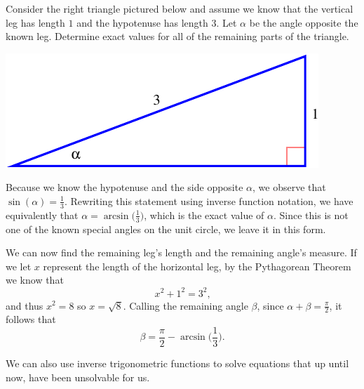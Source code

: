 \documentclass{ximera}
\begin{document}
\begin{example}
%
Consider the right triangle pictured below and assume we know that the vertical leg has length $1$ and the hypotenuse has length $3$.  Let $\alpha$ be the angle opposite the known leg.  Determine exact values for all of the remaining parts of the triangle.%
%
\begin{image}
\includegraphics[width=1\linewidth]{finding-angles-ex-1}
\end{image}

\begin{explanation}
Because we know the hypotenuse and the side opposite $\alpha$, we observe that $\sin(\alpha) = \frac{1}{3}$.  Rewriting this statement using inverse function notation, we have equivalently that $\alpha = \arcsin\!\bigg(\frac{1}{3}\bigg)$, which is the exact value of $\alpha$.  Since this is not one of the known special angles on the unit circle, we leave it in this form.%
\par
%
We can now find the remaining leg's length and the remaining angle's measure.  If we let $x$ represent the length of the horizontal leg, by the Pythagorean Theorem we know that
%
\begin{equation*}
x^2 + 1^2 = 3^2\text{,}
\end{equation*}
and thus $x^2 = 8$ so $x = \sqrt{8}$.  Calling the remaining angle $\beta$, since $\alpha + \beta = \frac{\pi}{2}$, it follows that
%
\begin{equation*}
\beta = \frac{\pi}{2} - \arcsin\!\bigg(\frac{1}{3}\bigg) \text{.}
\end{equation*}

\end{explanation}
\end{example}

We can also use inverse trigonometric functions to solve equations that up until now, have been unsolvable for us. 
\end{document}
